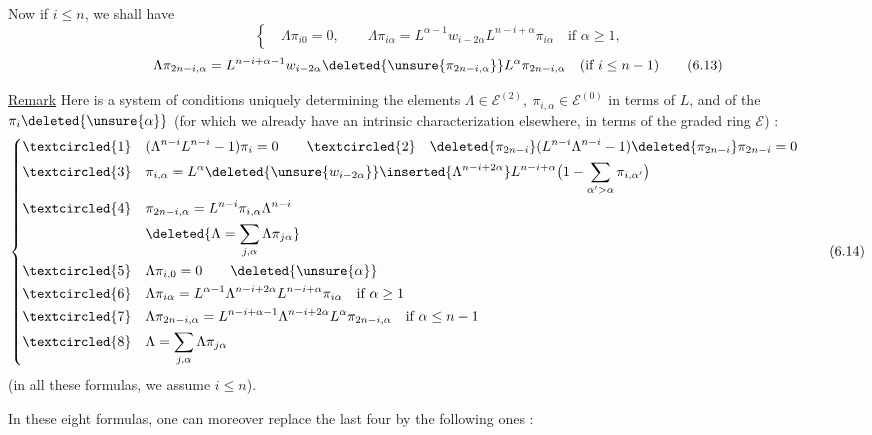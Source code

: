 Now if $i\leq n$, we shall have
\[
\left\{\quad\Lambda\pi_{i0}=0,\qquad\Lambda\pi_{i\alpha}=L^{\alpha-1}w_{i-2\alpha}L^{n-i+\alpha}\pi_{i\alpha}\quad\text{if }\alpha\geq1,\right.
\tag{6.12}
\]
\[
\Lambda\pi_{2n-i,\alpha}=L^{n-i+\alpha-1}w_{i-2\alpha}\deleted{\unsure{\pi_{2n-i,\alpha}}}L^\alpha\pi_{2n-i,\alpha}\quad(\text{if }i\leq n-1)
\tag{6.13}
\]

\uline{Remark} Here is a system of conditions uniquely determining the elements $\Lambda\in\mathcal E^{(2)},\ \pi_{i,\alpha}\in\mathcal E^{(0)}$ in terms of $L$, and of the $\pi_i\deleted{\unsure{\alpha}}$ (for which we already have an intrinsic characterization elsewhere, in terms of the graded ring $\mathcal E$) :
\[
\left\{\begin{aligned}
\textcircled{1}\quad &(\Lambda^{n-i}L^{n-i}-1)\pi_i=0
\qquad\textcircled{2}\quad\deleted{\pi_{2n-i}}(L^{n-i}\Lambda^{n-i}-1)\deleted{\pi_{2n-i}}\pi_{2n-i}=0\\
\textcircled{3}\quad &\pi_{i,\alpha}=L^\alpha\deleted{\unsure{w_{i-2\alpha}}}\inserted{\Lambda^{n-i+2\alpha}}L^{n-i+\alpha}\bigl(1-\sum_{\alpha'>\alpha}\pi_{i,\alpha'}\bigr)\\
\textcircled{4}\quad &\pi_{2n-i,\alpha}=L^{n-i}\pi_{i,\alpha}\Lambda^{n-i}\\
&\deleted{\Lambda=\sum_{j,\alpha}\Lambda\pi_{j\alpha}}\\
\textcircled{5}\quad &\Lambda\pi_{i,0}=0\qquad\deleted{\unsure{\alpha}}\\
\textcircled{6}\quad &\Lambda\pi_{i\alpha}=L^{\alpha-1}\Lambda^{n-i+2\alpha}L^{n-i+\alpha}\pi_{i\alpha}\quad\text{if }\alpha\geq1\\
\textcircled{7}\quad &\Lambda\pi_{2n-i,\alpha}=L^{n-i+\alpha-1}\Lambda^{n-i+2\alpha}L^\alpha\pi_{2n-i,\alpha}\quad\text{if }\alpha\leq n-1\\
\textcircled{8}\quad &\Lambda=\sum_{j,\alpha}\Lambda\pi_{j\alpha}
\end{aligned}\right.
\tag{6.14}
\]
(in all these formulas, we assume $i\leq n$).

In these eight formulas, one can moreover replace the last four by the following  ones :
